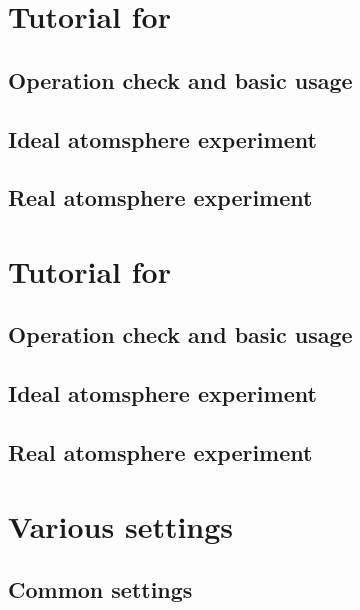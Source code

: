 \documentclass[a4paper]{report}
\begin{document}
\part{Tutorial for \scalerm}
 \chapter{Operation check and basic usage} \label{chap:tutorial_ideal}
 
 
 
 

 \chapter{Ideal atomsphere experiment} %

 \chapter{Real atomsphere experiment} \label{chap:tutorial_real}
 
 
 
 
 
 
 


\part{Tutorial for \scalegm}
 \chapter{Operation check and basic usage}
 
 \chapter{Ideal atomsphere experiment}
 
 \chapter{Real atomsphere experiment}


\part{Various settings} \label{part:basic_usel}
 \chapter{Common settings}
 
 
 
\end{document}
